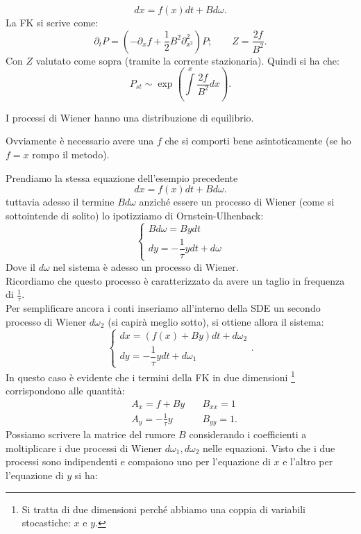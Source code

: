 \begin{exmp}
    \[
	dx = f(x) dt + Bd\omega
    .\] 
    La FK si scrive come:
    \[
        \partial_{t}P = \left(- \partial_{x}f + \frac{1}{2} B^2\partial^2_{x^2}\right)P; \qquad
	Z = \frac{2f}{B^2}
    .\] 
    Con $Z$  valutato come sopra (tramite la corrente stazionaria). Quindi si ha che:
    \[
	P_{st}\sim \exp\left(\int\limits^{x} \frac{2f}{B^2}dx \right) 
    .\] 
    \begin{greenbox}{}
        I processi di Wiener hanno una distribuzione di equilibrio.
    \end{greenbox}
    \noindent
    Ovviamente è necessario avere una $f$ che si comporti bene asintoticamente (se ho $f=x$ rompo il metodo).
\end{exmp}
\noindent

\begin{exmp}[Processo di OU]
    Prendiamo la stessa equazione dell'esempio precedente
    \[
	dx = f(x) dt + Bd\omega
    .\] 
    tuttavia adesso il termine $Bd\omega$ anziché essere un processo di Wiener (come si sottointende di solito) lo ipotizziamo di Ornstein-Ulhenback:
    \[
	\begin{cases}
	    Bd\omega  = Bydt\\
	    dy = -\dfrac{1}{\tau}ydt + d\omega
	\end{cases}
    \] 
    Dove il $d\omega$ nel sistema è adesso un processo di Wiener.\\
    Ricordiamo che questo processo è caratterizzato da avere un taglio in frequenza di $\frac{1}{\tau}$.\\
    Per semplificare ancora i conti inseriamo all'interno della SDE un secondo processo di Wiener $d\omega_2$ (si capirà meglio sotto), si ottiene allora il sistema:
    \[
        \begin{cases}
	    dx = \left(f(x) + By\right)dt + d\omega_2\\
	    dy = -\dfrac{1}{\tau}y dt + d\omega_1
        \end{cases}
    .\] 
    In questo caso è evidente che i termini della FK in due dimensioni
    \footnote{Si tratta di due dimensioni perché abbiamo una coppia di variabili stocastiche: $x$ e $y$.}
     corrispondono alle quantità:
    \[\begin{aligned}
	&A_x = f+By & \quad B_{xx} = 1\\
	&A_y = -\frac{1}{\tau}y &\quad B_{yy}=1
    .\end{aligned}\]
    Possiamo scrivere la matrice del rumore $B$ considerando i coefficienti a moltiplicare i due processi di Wiener $d\omega_1, d\omega_2$ nelle equazioni. Visto che i due processi sono indipendenti e compaiono uno per l'equazione di $x$ e l'altro per l'equazione di $y$ si ha:

\end{exmp}
